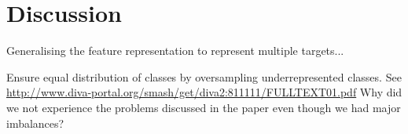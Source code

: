 
\section{Discussion}
\label{sec:discussion}
Generalising the feature representation to represent multiple targets...

Ensure equal distribution of classes by oversampling underrepresented classes. See \url{http://www.diva-portal.org/smash/get/diva2:811111/FULLTEXT01.pdf} Why did we not experience the problems discussed in the paper even though we had major imbalances?